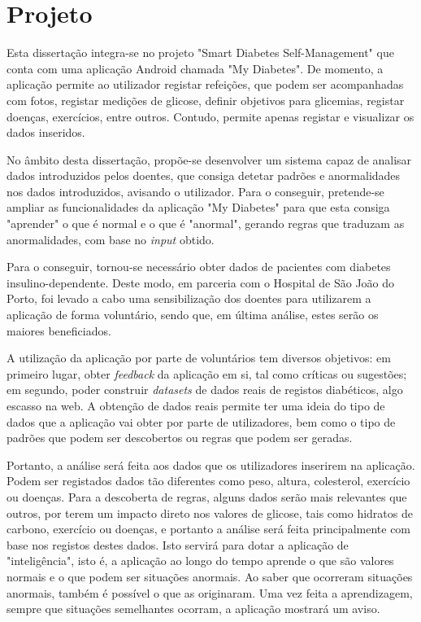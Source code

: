 \section{Projeto}

Esta dissertação integra-se no projeto "Smart Diabetes Self-Management" que conta com uma aplicação Android chamada "My Diabetes". De momento, a aplicação permite ao utilizador registar refeições, que podem ser acompanhadas com fotos, registar medições de glicose, definir objetivos para glicemias, registar doenças, exercícios, entre outros. Contudo, permite apenas registar e visualizar os dados inseridos.

No âmbito desta dissertação, propõe-se desenvolver um sistema capaz de analisar dados introduzidos pelos doentes, que consiga detetar padrões e anormalidades nos dados introduzidos, avisando o utilizador. Para o conseguir, pretende-se ampliar as funcionalidades da aplicação "My Diabetes" para que esta consiga "aprender" o que é normal e o que é "anormal", gerando regras que traduzam as anormalidades, com base no \textit{input} obtido.

Para o conseguir, tornou-se necessário obter dados de pacientes com diabetes insulino-dependente. Deste modo, em parceria com o Hospital de São João do Porto, foi levado a cabo uma sensibilização dos doentes para utilizarem a aplicação de forma voluntário, sendo que, em última análise, estes serão os maiores beneficiados.

A utilização da aplicação por parte de voluntários tem diversos objetivos: em primeiro lugar, obter \textit{feedback} da aplicação em si, tal como críticas ou sugestões; em segundo, poder construir \textit{datasets} de dados reais de registos diabéticos, algo escasso na web. A obtenção de dados reais permite ter uma ideia do tipo de dados que a aplicação vai obter por parte de utilizadores, bem como o tipo de padrões que podem ser descobertos ou regras que podem ser geradas.

Portanto, a análise será feita aos dados que os utilizadores inserirem na aplicação. Podem ser registados dados tão diferentes como peso, altura, colesterol, exercício ou doenças. Para a descoberta de regras, alguns dados serão mais relevantes que outros, por terem um impacto direto nos valores de glicose, tais como hidratos de carbono, exercício ou doenças, e portanto a análise será feita principalmente com base nos registos destes dados. Isto servirá para dotar a aplicação de "inteligência", isto é, a aplicação ao longo do tempo aprende o que são valores normais e o que podem ser situações anormais. Ao saber que ocorreram situações anormais, também é possível o que as originaram. Uma vez feita a aprendizagem, sempre que situações semelhantes ocorram, a aplicação mostrará um aviso.

